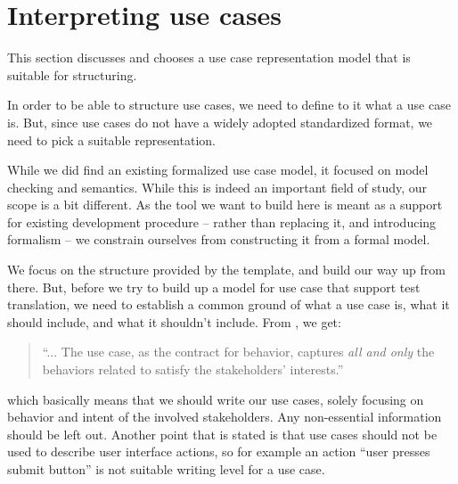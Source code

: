 \section{Interpreting use cases}
This section discusses and chooses a use case representation model that is suitable for structuring.\medskip

\noindent
In order to be able to structure use cases, we need to define to it what a use case is. But, since use cases do not have a widely adopted standardized format, we need to pick a suitable representation.\medskip

\noindent While we did find an existing formalized use case model\cite{klimek2010formal}, it focused on model checking and semantics. While this is indeed an important field of study, our scope is a bit different. As the tool we want to build here is meant as a support for existing development procedure -- rather than replacing it, and introducing formalism -- we constrain ourselves from constructing it from a formal model.\medskip

\noindent We focus on the structure provided by the template, and build our way up from there. But, before we try to build up a model for use case that support test translation, we need to establish a common ground of what a use case is, what it should include, and what it shouldn't include. From \cite{cockburn2000}, we get:
\begin{quote}
``... The use case, as the contract for behavior, captures \emph{all and only} the behaviors related to satisfy the stakeholders’ interests.''
\end{quote}which basically means that we should write our use cases, solely focusing on behavior and intent of the involved stakeholders. Any non-essential information should be left out. Another point that is stated\cite{larman2005} is that use cases should not be used to describe user interface actions, so for example an action ``user presses submit button'' is not suitable writing level for a use case.\medskip

